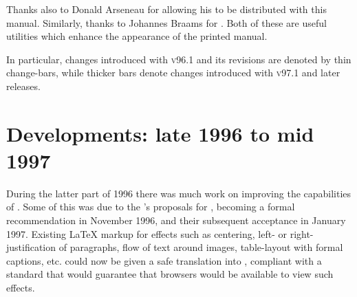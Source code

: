 \latex{\bigskip}\htmlrule

%
\noindent
Thanks also to Donald Arseneau  for allowing his  
to be distributed with this manual. 
Similarly, thanks to Johannes Braams  for .
%
\html{\\}
Both of these are useful utilities which enhance the appearance of the printed manual. 
\begin{latexonly}
In particular, changes introduced with  \textsc{v96.1} and its revisions are denoted 
by thin change-bars, while thicker bars denote changes introduced with  \textsc{v97.1}
and later releases.%
\end{latexonly}



\clearpage
\section*{Developments: late 1996 to mid 1997\label{recent97}}%
%
During the latter part of 1996 there was much work on improving the
capabilities of \latextohtml.
Some of this was due to the \WiiiC's proposals for \HTMLiii, 
becoming a formal recommendation in November 1996,
and their subsequent acceptance in January 1997. 
Existing \LaTeX{} markup for effects such as centering, left- 
or right-justification of paragraphs,
flow of text around images, table-layout with formal captions, etc.
could now be given a safe translation into \HTMLiii, compliant with a standard
that would guarantee that browsers would be available to view such effects.  

